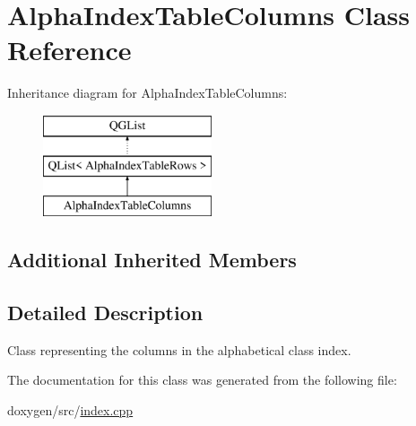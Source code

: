 \hypertarget{class_alpha_index_table_columns}{}\section{Alpha\+Index\+Table\+Columns Class Reference}
\label{class_alpha_index_table_columns}
Inheritance diagram for Alpha\+Index\+Table\+Columns\+:\begin{figure}[H]
\begin{center}
\leavevmode
\includegraphics[height=3.000000cm]{class_alpha_index_table_columns}
\end{center}
\end{figure}
\subsection*{Additional Inherited Members}


\subsection{Detailed Description}
Class representing the columns in the alphabetical class index. 

The documentation for this class was generated from the following file\+:\begin{DoxyCompactItemize}
\item 
doxygen/src/\mbox{\hyperlink{index_8cpp}{index.\+cpp}}\end{DoxyCompactItemize}
